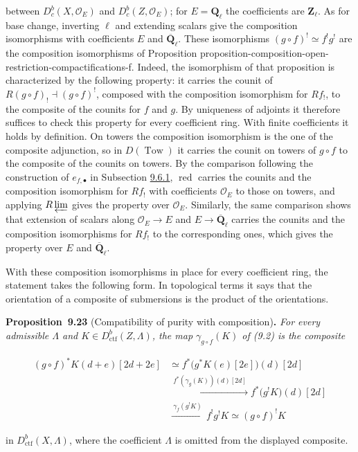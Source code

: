 \documentclass[11pt]{article}
\newenvironment{bpstatement}[2]{\par\addvspace{0.6\baselineskip}\noindent\textbf{#1}#2\textbf{.}\enspace\ignorespaces}
  {\par\addvspace{0.4\baselineskip}}
\newenvironment{bpstatementit}[2]{\begin{bpstatement}{#1}{#2}\itshape\ignorespaces}{\end{bpstatement}}
\providecommand{\Dbc}{}\renewcommand{\Dbc}{D^b_c}
\begin{document}
between \(\Dbc(X,\mathcal O_E)\) and \(\Dbc(Z,\mathcal O_E)\); for \(E=\mathbf Q_\ell\) the coefficients are \(\mathbf Z_\ell\). As for base change, inverting \(\ell\) and extending scalars give the composition isomorphisms with coefficients \(E\) and \(\overline{\mathbf Q}_\ell\). These isomorphisms \((g\circ f)^!\simeq f^!g^!\) are the composition isomorphisms of Proposition proposition-composition-open-restriction-compactifications-f. Indeed, the isomorphism of that proposition is characterized by the following property: it carries the counit of \(R(g\circ f)_!\dashv(g\circ f)^!\), composed with the composition isomorphism for \(Rf_!\), to the composite of the counits for \(f\) and \(g\). By uniqueness of adjoints it therefore suffices to check this property for every coefficient ring. With finite coefficients it holds by definition. On towers the composition isomorphism is the one of the composite adjunction, so in \(D(\operatorname{Tow})\) it carries the counit on towers of \(g\circ f\) to the composite of the counits on towers. By the comparison following the construction of \(e_{f,\bullet}\) in Subsection \hyperref[bp74]{9.6.1}, \(\operatorname{red}\) carries the counits and the composition isomorphism for \(Rf_!\) with coefficients \(\mathcal O_E\) to those on towers, and applying \(R\varprojlim\) gives the property over \(\mathcal O_E\). Similarly, the same comparison shows that extension of scalars along \(\mathcal O_E\to E\) and \(E\to\overline{\mathbf Q}_\ell\) carries the counits and the composition isomorphisms for \(Rf_!\) to the corresponding ones, which gives the property over \(E\) and \(\overline{\mathbf Q}_\ell\).

With these composition isomorphisms in place for every coefficient ring, the statement takes the following form. In topological terms it says that the orientation of a composite of submersions is the product of the orientations.

\label{bp79}%
\begin{bpstatementit}{Proposition~9.23}{ (Compatibility of purity with composition)}
For every admissible \(\Lambda\) and \(K\in D^b_{\mathrm{ctf}}(Z,\Lambda)\), the map \(\gamma_{g\circ f}(K)\) of (9.2) is the composite

\[
\begin{aligned}
(g\circ f)^{*}K(d+e)[2d+2e]
&\simeq f^{*}\bigl(g^{*}K(e)[2e]\bigr)(d)[2d]\\
&\xrightarrow{\ f^{*}(\gamma_g(K))(d)[2d]\ }
f^{*}\bigl(g^!K\bigr)(d)[2d]\\
&\xrightarrow{\ \gamma_f(g^!K)\ }
f^!g^!K
\simeq(g\circ f)^!K
\end{aligned}
\]

in \(D^b_{\mathrm{ctf}}(X,\Lambda)\), where the coefficient \(\Lambda\) is omitted from the displayed composite.
\end{bpstatementit}
\end{document}
